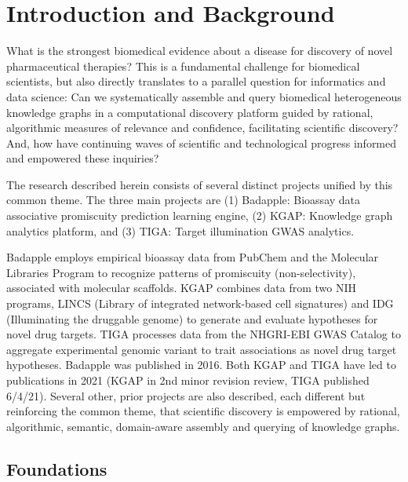 \chapter{Introduction and Background}

What is the strongest biomedical evidence about a disease for discovery of novel pharmaceutical therapies? This is a fundamental challenge for biomedical scientists, but also directly translates to a parallel question for informatics and data science: Can we systematically assemble and query biomedical heterogeneous knowledge graphs in a computational discovery platform guided by rational, algorithmic measures of relevance and confidence, facilitating scientific discovery? And, how have continuing waves of scientific and technological progress informed and empowered these inquiries? 

The research described herein consists of several distinct projects unified by this common theme. The three main projects are (1) Badapple: Bioassay data associative promiscuity prediction learning engine, (2) KGAP: Knowledge graph analytics platform, and (3) TIGA: Target illumination GWAS analytics. 

Badapple employs empirical bioassay data from PubChem and the Molecular Libraries Program to recognize patterns of promiscuity (non-selectivity), associated with molecular scaffolds. 
KGAP combines data from two NIH programs, LINCS (Library of integrated network-based cell signatures)  and IDG (Illuminating the druggable genome) to generate and evaluate hypotheses for novel drug targets. TIGA processes data from the NHGRI-EBI GWAS Catalog to aggregate experimental genomic variant to trait associations as novel drug target hypotheses.  Badapple was published in 2016. Both KGAP and TIGA have led to publications in 2021 (KGAP in 2nd minor revision review, TIGA published 6/4/21). Several other, prior projects are also described, each different but reinforcing the common theme, that scientific discovery is empowered by rational, algorithmic, semantic, domain-aware assembly and querying of knowledge graphs. 

\section{Foundations}

